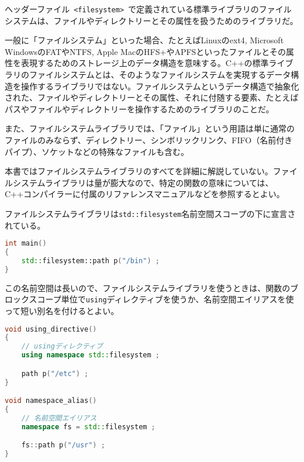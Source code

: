 %

ヘッダーファイル~\lstinline!<filesystem>!~で定義されている標準ライブラリのファイルシステムは、ファイルやディレクトリーとその属性を扱うためのライブラリだ。

一般に「ファイルシステム」といった場合、たとえばLinuxのext4, Microsoft
WindowsのFATやNTFS, Apple
MacのHFS+やAPFSといったファイルとその属性を表現するためのストレージ上のデータ構造を意味する。C++の標準ライブラリのファイルシステムとは、そのようなファイルシステムを実現するデータ構造を操作するライブラリではない。ファイルシステムというデータ構造で抽象化された、ファイルやディレクトリーとその属性、それに付随する要素、たとえばパスやファイルやディレクトリーを操作するためのライブラリのことだ。

また、ファイルシステムライブラリでは、「ファイル」という用語は単に通常のファイルのみならず、ディレクトリー、シンボリックリンク、FIFO（名前付きパイプ）、ソケットなどの特殊なファイルも含む。

本書ではファイルシステムライブラリのすべてを詳細に解説していない。ファイルシステムライブラリは量が膨大なので、特定の関数の意味については、C++コンパイラーに付属のリファレンスマニュアルなどを参照するとよい。

%

ファイルシステムライブラリは\lstinline!std::filesystem!名前空間スコープの下に宣言されている。

\begin{lstlisting}[language=C++]
int main()
{
    std::filesystem::path p("/bin") ;
}
\end{lstlisting}

この名前空間は長いので、ファイルシステムライブラリを使うときは、関数のブロックスコープ単位で\lstinline!using!ディレクティブを使うか、名前空間エイリアスを使って短い別名を付けるとよい。

\begin{lstlisting}[language=C++]
void using_directive()
{
    // usingディレクティブ
    using namespace std::filesystem ;

    path p("/etc") ;
}

void namespace_alias()
{
    // 名前空間エイリアス
    namespace fs = std::filesystem ;

    fs::path p("/usr") ;
}
\end{lstlisting}

